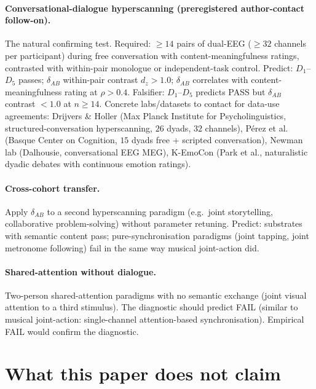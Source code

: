 \documentclass[11pt,a4paper]{article}
\begin{document}
\paragraph{Conversational-dialogue hyperscanning (preregistered author-contact follow-on).} The natural confirming test. Required: $\geq 14$ pairs of dual-EEG ($\geq 32$ channels per participant) during free conversation with content-meaningfulness ratings, contrasted with within-pair monologue or independent-task control. Predict: $D_1$--$D_5$ passes; $\delta_{AB}$ within-pair contrast $d_z > 1.0$; $\delta_{AB}$ correlates with content-meaningfulness rating at $\rho > 0.4$. Falsifier: $D_1$--$D_5$ predicts PASS but $\delta_{AB}$ contrast $< 1.0$ at $n \geq 14$. Concrete labs/datasets to contact for data-use agreements: Drijvers \& Holler (Max Planck Institute for Psycholinguistics, structured-conversation hyperscanning, $26$ dyads, $32$ channels), P\'erez et al. (Basque Center on Cognition, $15$ dyads free + scripted conversation), Newman lab (Dalhousie, conversational EEG MEG), K-EmoCon (Park et al., naturalistic dyadic debates with continuous emotion ratings).

\paragraph{Cross-cohort transfer.} Apply $\delta_{AB}$ to a second hyperscanning paradigm (e.g.\ joint storytelling, collaborative problem-solving) without parameter retuning. Predict: substrates with semantic content pass; pure-synchronisation paradigms (joint tapping, joint metronome following) fail in the same way musical joint-action did.

\paragraph{Shared-attention without dialogue.} Two-person shared-attention paradigms with no semantic exchange (joint visual attention to a third stimulus). The diagnostic should predict FAIL (similar to musical joint-action: single-channel attention-based synchronisation). Empirical FAIL would confirm the diagnostic.

\section{What this paper does not claim}\label{sec:nonclaims}
\end{document}
